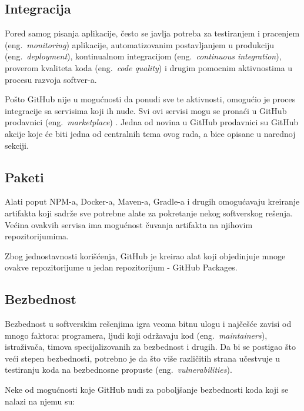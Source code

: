 \documentclass[12pt]{report}
\begin{document}
\subsection{Integracija}
Pored samog pisanja aplikacije, često se javlja potreba za testiranjem i pracenjem (eng.\ \textit{monitoring}) aplikacije, automatizovanim postavljanjem u produkciju (eng.\ \textit{deployment}), kontinualnom integracijom (eng.\ \textit{continuous integration}), proverom kvaliteta koda (eng.\ \textit{code quality}) i drugim pomocnim aktivnostima u procesu razvoja softver-a.

Pošto GitHub nije u mogućnosti da ponudi sve te aktivnosti, omogućio je proces integracije sa servisima koji ih nude. Svi ovi servisi mogu se pronaći u GitHub prodavnici (eng.\ \textit{marketplace}) \cite{marketplace}. Jedna od novina u GitHub prodavnici su GitHub akcije koje će biti jedna od centralnih tema ovog rada, a bice opisane u narednoj sekciji.

\subsection{Paketi}
Alati poput NPM-a, Docker-a, Maven-a, Gradle-a i drugih omogućavaju kreiranje artifakta koji sadrže sve potrebne alate za pokretanje nekog softverskog rešenja. Većina ovakvih servisa ima mogućnost čuvanja artifakta na njihovim repozitorijumima.

Zbog jednostavnosti korišćenja, GitHub je kreirao alat koji objedinjuje mnoge ovakve repozitorijume u jedan repozitorijum - GitHub Packages.

\subsection{Bezbednost}
Bezbednost u softverskim rešenjima igra veoma bitnu ulogu i najčešće zavisi od mnogo faktora: programera, ljudi koji održavaju kod (eng.\ \textit{maintainers}), istraživača, timova specijalizovanih za bezbednost i drugih. Da bi se postigao što veći stepen bezbednosti, potrebno je da što više različitih strana učestvuje u testiranju koda na bezbednosne propuste (eng.\ \textit{vulnerabilities}).

Neke od mogućnosti koje GitHub nudi za poboljšanje bezbednosti koda koji se nalazi na njemu su:
\end{document}
